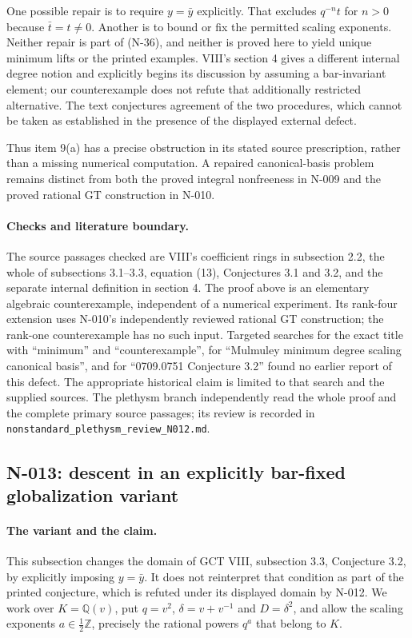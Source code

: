 One possible repair is to require $y=\bar y$ explicitly.  That
excludes $q^{-n}t$ for $n>0$ because $\bar t=t\ne0$.  Another is
to bound or fix the permitted scaling exponents.  Neither repair
is part of (N-36), and neither is proved here to yield unique
minimum lifts or the printed examples.  VIII's section 4 gives a
different internal degree notion and explicitly begins its
discussion by assuming a bar-invariant element; our counterexample
does not refute that additionally restricted alternative.  The
text conjectures agreement of the two procedures, which cannot be
taken as established in the presence of the displayed external
defect.

Thus item 9(a) has a precise obstruction in its stated source
prescription, rather than a missing numerical computation.  A
repaired canonical-basis problem remains distinct from both the
proved integral nonfreeness in N-009 and the proved rational GT
construction in N-010.

\paragraph{Checks and literature boundary.}
The source passages checked are VIII's coefficient rings in
subsection 2.2, the whole of subsections 3.1--3.3, equation (13),
Conjectures 3.1 and 3.2, and the separate internal definition in
section 4.  The proof above is an elementary algebraic
counterexample, independent of a numerical experiment.  Its
rank-four extension uses N-010's independently reviewed rational
GT construction; the rank-one counterexample has no such input.
Targeted searches for the exact title with ``minimum'' and
``counterexample'', for ``Mulmuley minimum degree scaling canonical
basis'', and for ``0709.0751 Conjecture 3.2'' found no earlier report
of this defect.  The appropriate historical claim is limited to that
search and the supplied sources.  The plethysm branch independently
read the whole proof and the complete primary source passages;
its review is recorded in
\nolinkurl{nonstandard_plethysm_review_N012.md}.


\subsection{N-013: descent in an explicitly bar-fixed globalization variant}
\label{sec:nonstandard-bar-fixed-descent}

\paragraph{The variant and the claim.}
This subsection changes the domain of GCT VIII, subsection 3.3,
Conjecture 3.2, by explicitly imposing $y=\bar y$.  It does not
reinterpret that condition as part of the printed conjecture, which
is refuted under its displayed domain by N-012.  We work over
$K=\mathbb Q(v)$, put $q=v^2$, $\delta=v+v^{-1}$ and $D=\delta^2$,
and allow the scaling exponents $a\in\tfrac12\mathbb Z$, precisely
the rational powers $q^a$ that belong to $K$.


